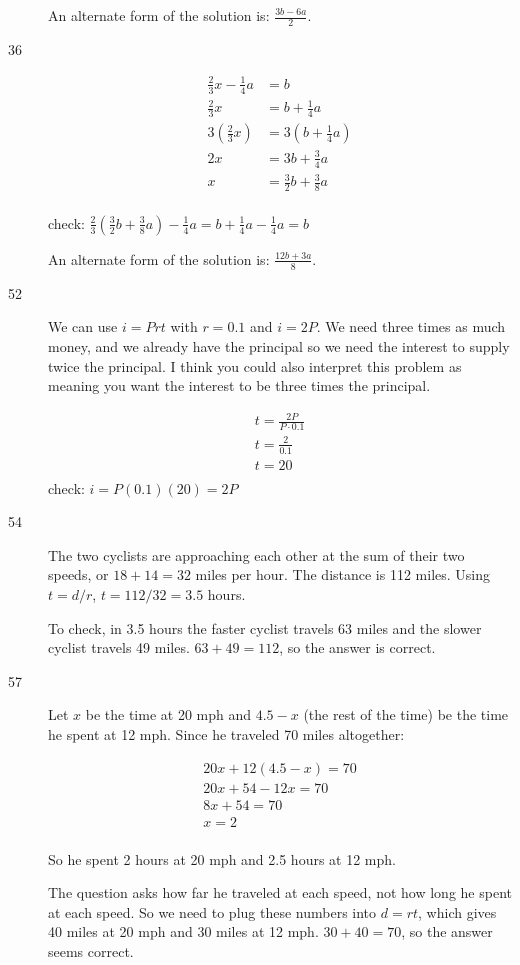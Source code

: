 \documentclass{exam}
\begin{document}
\begin{description}
An alternate form of the solution is: \( \frac{3b - 6a}{2} \).

\item[36]
\begin{align*}
  \frac{2}{3}x - \frac{1}{4}a &= b \\
  \frac{2}{3}x  &= b + \frac{1}{4}a \\
  3 \left( \frac{2}{3} x \right)  &= 3 \left( b + \frac{1}{4} a \right) \\
  2x  &= 3b + \frac{3}{4}a \\
  x  &= \frac{3}{2}b + \frac{3}{8}a \\
\end{align*}

check: \( \frac{2}{3} \left( \frac{3}{2}b + \frac{3}{8}a \right) - \frac{1}{4}a = b + \frac{1}{4}a - \frac{1}{4}a = b \)

An alternate form of the solution is: \( \frac{12b + 3a}{8} \).

\item[52] We can use \( i = Prt \) with $r = 0.1$ and \(i = 2P\).  We need three times as much money, and we already
  have the principal so we need the interest to supply twice the principal.  I think you could also interpret this
  problem as meaning you want the interest to be three times the principal.

\begin{eqnarray*}
  t = \frac{2P}{P \cdot 0.1} \\
  t = \frac{2}{0.1} \\
  t = 20 \\
\end{eqnarray*}
check: \( i = P(0.1)(20) = 2P \)

\item[54] The two cyclists are approaching each other at the sum of their two speeds, or \(18 + 14 = 32\) miles per
  hour.  The distance is 112 miles.  Using \(t = d/r\), \(t = 112/32 = 3.5\) hours.

  To check, in 3.5 hours the faster cyclist travels 63 miles and the slower cyclist travels 49 miles.  \(63 + 49 =
  112\), so the answer is correct.

\item[57] Let $x$ be the time at 20 mph and $4.5 - x$ (the rest of the time) be the time he spent at 12 mph.  Since he
  traveled 70 miles altogether:

\begin{eqnarray*}
  20x + 12(4.5 - x) = 70 \\
  20x + 54 - 12x = 70 \\
  8x + 54 = 70 \\
  x = 2 \\
\end{eqnarray*}

So he spent 2 hours at 20 mph and 2.5 hours at 12 mph.  

The question asks how far he traveled at each speed, not how
long he spent at each speed.  So we need to plug these numbers into \(d = rt\), which gives 40 miles at 20 mph and 30
miles at 12 mph.  \(30 + 40 = 70\), so the answer seems correct.

\end{description}
\end{document}
